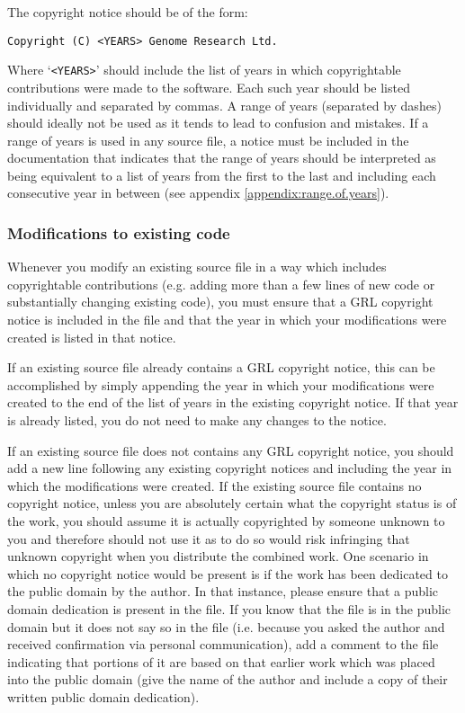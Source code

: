 \documentclass[10pt,a4paper]{article}
\begin{document}
\par The copyright notice should be of the form: 
\begin{verbatim}
Copyright (C) <YEARS> Genome Research Ltd.
\end{verbatim}

\par Where `\texttt{<YEARS>}' should include the list of years in which copyrightable 
contributions \cite{define:copyrightable} were made to the software. Each such year 
should be listed individually and separated by commas. A range of years (separated 
by dashes) should ideally not be used as it tends to lead to confusion and mistakes. 
If a range of years is used in any source file, a notice must be included in the 
documentation that indicates that the range of years should be interpreted as being 
equivalent to a list of years from the first to the last and including each consecutive 
year in between (see appendix \ref{appendix:range.of.years}). 

\subsubsection{Modifications to existing code}
\par Whenever you modify an existing source file in a way which includes copyrightable 
contributions (e.g. adding more than a few lines of new code or substantially changing 
existing code), you must ensure that a GRL copyright notice is included in the file 
and that the year in which your modifications were created is listed in that notice. 

\par If an existing source file already contains a GRL copyright notice, this can be 
accomplished by simply appending the year in which your modifications were created 
to the end of the list of years in the existing copyright notice. If that year is already 
listed, you do not need to make any changes to the notice. 

\par If an existing source file does not contains any GRL copyright 
notice, you should add a new line following any existing copyright notices and 
including the year in which the modifications were created. If the existing source 
file contains no copyright notice, unless you are absolutely certain what the 
copyright status is of the work, you should assume it is actually copyrighted by 
someone unknown to you and therefore should not use it as to do so would risk 
infringing that unknown copyright when you distribute the combined work. One 
scenario in which no copyright notice would be present is if the work has been 
dedicated to the public domain by the author. In that instance, please ensure 
that a public domain dedication is present in the file. If you know 
that the file is in the public domain but it does not say so in the file (i.e. because 
you asked the author and received confirmation via personal communication), 
add a comment to the file indicating that portions of it are based on that earlier 
work which was placed into the public domain (give the name of the author and 
include a copy of their written public domain dedication). 
\end{document}
